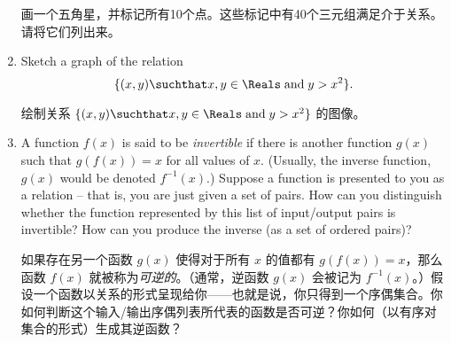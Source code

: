 \begin{enumerate}
    画一个五角星，并标记所有10个点。这些标记中有40个三元组满足介于关系。请将它们列出来。
    
    \vfill
    
    
    \workbookpagebreak
    
    \item Sketch a graph of the relation 
    \[
    \{ (x,y) \suchthat x,y \in \Reals \; \mbox{and} \; y > x^2 \}.
    \]
    
    绘制关系 $\{ (x,y) \suchthat x,y \in \Reals \; \mbox{and} \; y > x^2 \}$ 的图像。
    
    
    \wbvfill
    
    \item A function $f(x)$ is said to be  
    \emph{invertible} if there is another function $g(x)$ such that 
    $g(f(x)) = x$ for all values of $x$. (Usually, the inverse function,
    $g(x)$ would be denoted $f^{-1}(x)$.)   Suppose a function is presented 
    to you as a relation -- that is, you are just given a set of pairs.
    How can you distinguish whether the function represented by this list 
    of input/output pairs is invertible? How can you produce the inverse 
    (as a set of ordered pairs)?
    
    如果存在另一个函数 $g(x)$ 使得对于所有 $x$ 的值都有 $g(f(x)) = x$，那么函数 $f(x)$ 就被称为\emph{可逆的}。（通常，逆函数 $g(x)$ 会被记为 $f^{-1}(x)$。）假设一个函数以关系的形式呈现给你——也就是说，你只得到一个序偶集合。你如何判断这个输入/输出序偶列表所代表的函数是否可逆？你如何（以有序对集合的形式）生成其逆函数？
\end{enumerate}
